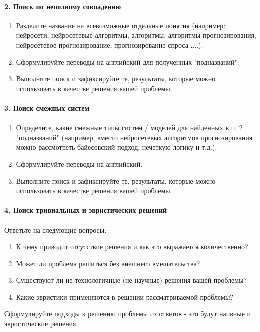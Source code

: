 \documentclass{report}
\begin{document}
\paragraph{2. Поиск по неполному совпадению}
\begin{enumerate}
	\item Разделите название на всевозможные отдельные понятия (например: нейросети, нейросетевые алгоритмы, алгоритмы, алгоритмы прогнозирования, нейросетевое прогнозирование, прогнозирование спроса ....).
	\item Сформулируйте переводы на английский для полученных "подназваний".
	\item Выполните поиск и зафиксируйте те, результаты, которые можно использовать в качестве решения вашей проблемы.
\end{enumerate}

\paragraph{3. Поиск смежных систем}
\begin{enumerate}
	\item Определите, какие смежные типы систем / моделей для найденных в п. 2 "подназваний" (например, вместо нейросетевых алгоритмов прогнозирования можно рассмотреть байесовский подход, нечеткую логику и т.д.).
	\item Сформулируйте переводы на английский.
	\item Выполните поиск и зафиксируйте те, результаты, которые можно использовать в качестве решения вашей проблемы.
\end{enumerate}

\paragraph{4. Поиск тривиальных и эвристических решений}
Ответьте на следующие вопросы:
\begin{enumerate}
	\item К чему приводит отсутствие решения и как это выражается количественно?
	\item Может ли проблема решиться без внешнего вмешательства?
	\item Существуют ли не технологичные (не научные) решения вашей проблемы?
	\item Какие эвристики применяются в решении рассматриваемой проблемы?
\end{enumerate}
Сформулируйте подходы к решению проблемы из ответов - это будут наивные и эвристические решения.
\end{document}
